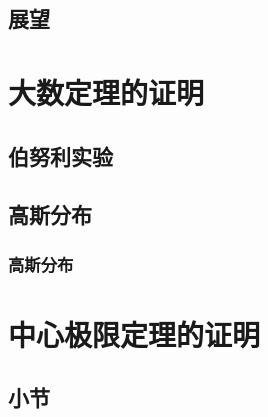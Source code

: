 \documentclass[master,draft]{styles/hdu-thesis}
\begin{document}
  \section{展望}




% 


\ifreviewhead
  
\else
  \personalAchievements
  
\fi



\thesisappendix

\chapter{大数定理的证明}
  \section{伯努利实验}
  \section{高斯分布}
    \subsection{高斯分布}
\chapter{中心极限定理的证明}
  \section{小节}
\end{document}
